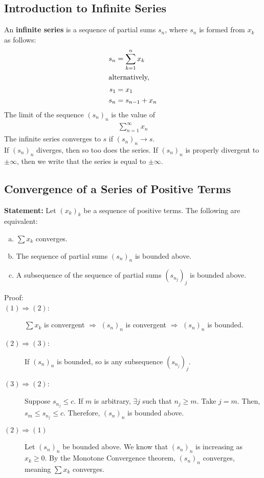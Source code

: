 \documentclass[10pt]{extarticle}
\begin{document}
  \subsection{Introduction to Infinite Series}%
    An \textbf{infinite series} is a sequence of partial sums $s_n$, where $s_n$ is formed from $x_k$ as follows:
    \begin{align*}
      s_n &= \sum_{k=1}^{n} x_k\\
      \shortintertext{alternatively,}
      s_1 &= x_1\\
      s_{n} &= s_{n-1} + x_n
    \end{align*}
    The limit of the sequence $(s_n)_n$ is the value of
    \begin{align*}
      \sum_{n=1}^{\infty}x_n
    \end{align*}
    The infinite series converges to $s$ if $(s_n)_n \rightarrow s$.\\

    If $(s_n)_n$ diverges, then so too does the series. If $(s_n)_n$ is properly divergent to $\pm \infty$, then we write that the series is equal to $\pm\infty$.
  \subsection{Convergence of a Series of Positive Terms}%
  \textbf{Statement:} Let $(x_k)_k$ be a sequence of positive terms. The following are equivalent:
    \begin{enumerate}[(a)]
      \item $\sum x_k$ converges.
      \item The sequence of partial sums $(s_n)_n$ is bounded above.
      \item A subsequence of the sequence of partial sums $(s_{n_j})_j$ is bounded above.
    \end{enumerate}
    \begin{description}
      \item[Proof:] \hfill
      \item[$(1) \Rightarrow (2)$:] $\sum x_k$ is convergent $\Rightarrow$ $(s_n)_n$ is convergent $\Rightarrow$ $(s_n)_n$ is bounded.
      \item[$(2) \Rightarrow (3)$:] If $(s_n)_n$ is bounded, so is any subsequence $(s_{n_j})_j$.
      \item[$(3) \Rightarrow (2)$:] Suppose $s_{n_j} \leq c$. If $m$ is arbitrary, $\exists j$ such that $n_j \geq m$. Take $j = m$. Then, $s_{m} \leq s_{n_j} \leq c$. Therefore, $(s_n)_n$ is bounded above.
      \item[$(2) \Rightarrow (1)$] Let $(s_n)_n$ be bounded above. We know that $(s_n)_n$ is increasing as $x_k \geq 0$. By the Monotone Convergence theorem, $(s_n)_n$ converges, meaning $\sum x_k$ converges.
    \end{description}
\end{document}
